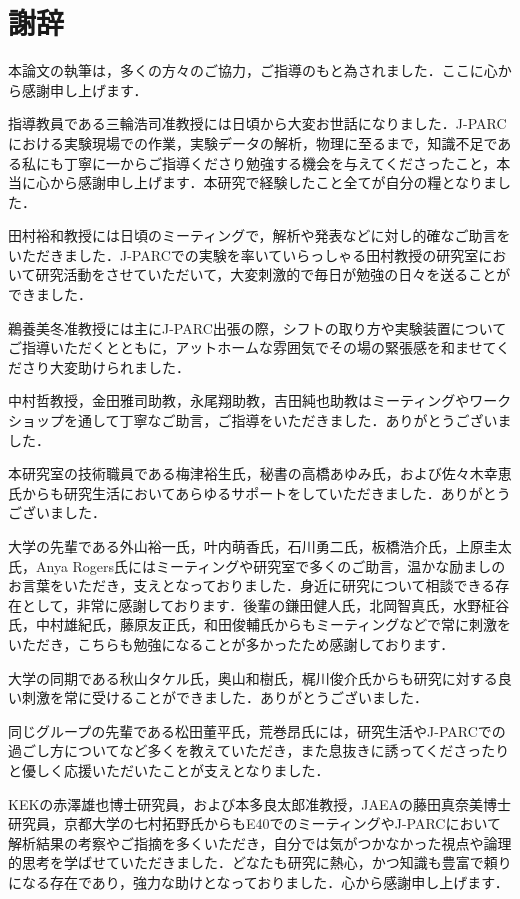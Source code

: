 

\chapter*{謝辞}
本論文の執筆は，多くの方々のご協力，ご指導のもと為されました．ここに心から感謝申し上げます．

指導教員である三輪浩司准教授には日頃から大変お世話になりました．J-PARCにおける実験現場での作業，実験データの解析，物理に至るまで，知識不足である私にも丁寧に一からご指導くださり勉強する機会を与えてくださったこと，本当に心から感謝申し上げます．本研究で経験したこと全てが自分の糧となりました．

田村裕和教授には日頃のミーティングで，解析や発表などに対し的確なご助言をいただきました．J-PARCでの実験を率いていらっしゃる田村教授の研究室において研究活動をさせていただいて，大変刺激的で毎日が勉強の日々を送ることができました．

鵜養美冬准教授には主にJ-PARC出張の際，シフトの取り方や実験装置についてご指導いただくとともに，アットホームな雰囲気でその場の緊張感を和ませてくださり大変助けられました．

中村哲教授，金田雅司助教，永尾翔助教，吉田純也助教はミーティングやワークショップを通して丁寧なご助言，ご指導をいただきました．ありがとうございました．

本研究室の技術職員である梅津裕生氏，秘書の高橋あゆみ氏，および佐々木幸恵氏からも研究生活においてあらゆるサポートをしていただきました．ありがとうございました．

大学の先輩である外山裕一氏，叶内萌香氏，石川勇二氏，板橋浩介氏，上原圭太氏，Anya Rogers氏にはミーティングや研究室で多くのご助言，温かな励ましのお言葉をいただき，支えとなっておりました．身近に研究について相談できる存在として，非常に感謝しております．後輩の鎌田健人氏，北岡智真氏，水野柾谷氏，中村雄紀氏，藤原友正氏，和田俊輔氏からもミーティングなどで常に刺激をいただき，こちらも勉強になることが多かったため感謝しております．

大学の同期である秋山タケル氏，奥山和樹氏，梶川俊介氏からも研究に対する良い刺激を常に受けることができました．ありがとうございました．

同じグループの先輩である松田董平氏，荒巻昂氏には，研究生活やJ-PARCでの過ごし方についてなど多くを教えていただき，また息抜きに誘ってくださったりと優しく応援いただいたことが支えとなりました．

KEKの赤澤雄也博士研究員，および本多良太郎准教授，JAEAの藤田真奈美博士研究員，京都大学の七村拓野氏からもE40でのミーティングやJ-PARCにおいて解析結果の考察やご指摘を多くいただき，自分では気がつかなかった視点や論理的思考を学ばせていただきました．どなたも研究に熱心，かつ知識も豊富で頼りになる存在であり，強力な助けとなっておりました．心から感謝申し上げます．

